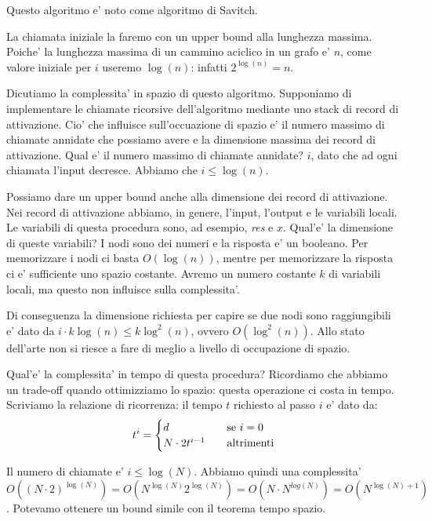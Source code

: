 Questo algoritmo e' noto come algoritmo di Savitch.

La chiamata iniziale la faremo con un upper bound alla lunghezza massima. Poiche' la lunghezza
massima di un cammino aciclico in un grafo e' $n$, come valore iniziale per $i$ useremo $\log(n)$:
infatti $2^{\log(n)} = n$.

Dicutiamo la complessita' in spazio di questo algoritmo. Supponiamo di implementare le chiamate
ricorsive dell'algoritmo mediante uno stack di record di attivazione. Cio' che influisce
sull'occuazione di spazio e' il numero massimo di chiamate annidate che possiamo avere e la
dimensione massima dei record di attivazione. Qual e' il numero massimo di chiamate annidate? $i$,
dato che ad ogni chiamata l'input decresce. Abbiamo che $i \leq \log(n)$.

Possiamo dare un upper bound anche alla dimensione dei record di attivazione. Nei record di
attivazione abbiamo, in genere, l'input, l'output e le variabili locali. Le variabili di questa
procedura sono, ad esempio, \textit{res} e $x$. Qual'e' la dimensione di queste variabili? I nodi
sono dei numeri e la risposta e' un booleano. Per memorizzare i nodi ci basta $O(\log(n))$, mentre
per memorizzare la risposta ci e' sufficiente uno spazio costante. Avremo un numero costante $k$ di
variabili locali, ma questo non influisce sulla complessita'.

Di conseguenza la dimensione richiesta per capire se due nodi sono raggiungibili e' dato da $i\cdot
k\log(n) \leq k\log^{2}(n)$, ovvero $O(\log^{2}(n))$. Allo stato dell'arte non si riesce a fare di
meglio a livello di occupazione di spazio.

Qual'e' la complessita' in tempo di questa procedura? Ricordiamo che abbiamo un trade-off quando
ottimizziamo lo spazio: questa operazione ci costa in tempo. Scriviamo la relazione di ricorrenza:
il tempo $t$ richiesto al passo $i$ e' dato da:
\begin{equation*}
    t^{i} =
    \begin{cases}
        d \quad &\text{se $i = 0$}\\
        N\cdot 2t^{i-1} \quad &\text{altrimenti}\\
    \end{cases}
\end{equation*}

Il numero di chiamate e' $i \leq \log(N)$. Abbiamo quindi una complessita' $O((N\cdot 2)^{\log(N)})
= O(N^{\log(N)}2^{\log(N)}) = O(N\cdot N^{log(N)}) = O(N^{\log(N)+1})$. Potevamo ottenere un bound
simile con il teorema tempo spazio.

